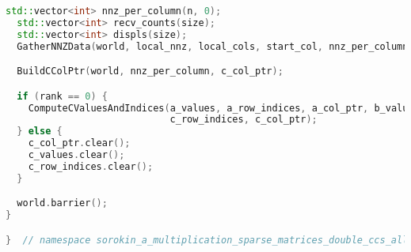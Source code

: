 \documentclass[12pt]{article}
\begin{document}
\begin{lstlisting}[language=C++]
  std::vector<int> nnz_per_column(n, 0);
  std::vector<int> recv_counts(size);
  std::vector<int> displs(size);
  GatherNNZData(world, local_nnz, local_cols, start_col, nnz_per_column, recv_counts, displs);

  BuildCColPtr(world, nnz_per_column, c_col_ptr);

  if (rank == 0) {
    ComputeCValuesAndIndices(a_values, a_row_indices, a_col_ptr, b_values, b_row_indices, b_col_ptr, m, n, c_values,
                             c_row_indices, c_col_ptr);
  } else {
    c_col_ptr.clear();
    c_values.clear();
    c_row_indices.clear();
  }

  world.barrier();
}

}  // namespace sorokin_a_multiplication_sparse_matrices_double_ccs_all
\end{lstlisting}
\end{document}
